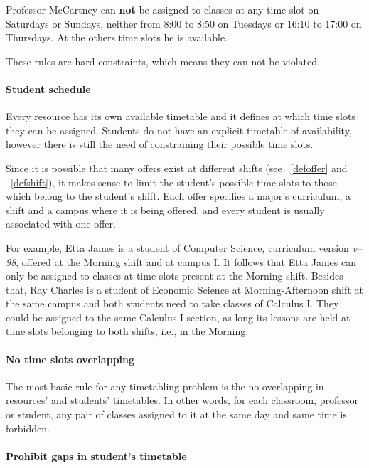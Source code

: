 Professor McCartney can \textbf{not} be assigned to classes at any time slot on Saturdays or Sundays, neither from 8:00 to 8:50 on Tuesdays or 16:10 to 17:00 on Thursdays. At the others time slots he is available.

These rules are hard constraints, which means they can not be violated.


\paragraph{Student schedule}
\label{constrstudentsched}

Every resource has its own available timetable and it defines at which time slots they can be assigned. Students do not have an explicit timetable of availability, however there is still the need of constraining their possible time slots.

Since it is possible that many offers exist at different shifts (see ~\ref{defoffer} and ~\ref{defshift}), it makes sense to limit the student's possible time slots to those which belong to the student's shift. Each offer specifies a major's curriculum, a shift and a campus where it is being offered, and every student is usually associated with one offer.

For example, Etta James is a student of Computer Science, curriculum version \textit{v--98}, offered at the Morning shift and at campus I. It follows that Etta James can only be assigned to classes at time slots present at the Morning shift. Besides that, Ray Charles is a student of Economic Science at Morning-Afternoon shift at the same campus and both students need to take classes of Calculus I. They could be assigned to the same Calculus I section, as long its lessons are held at time slots belonging to both shifts, i.e., in the Morning.


\paragraph{No time slots overlapping}
\label{constroverlap}

The most basic rule for any timetabling problem is the no overlapping in resources' and students' timetables. In other words, for each classroom, professor or student, any pair of classes assigned to it at the same day and same time is forbidden.


\paragraph{Prohibit gaps in student's timetable}
\label{constrmingapstudent}

